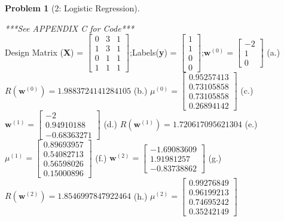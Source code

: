 \documentclass[11pt]{article}
\theoremstyle{quest}
\newtheorem*{question}{Problem}
\begin{document}
\newpage
\begin{question}[2: Logistic Regression] \end{question}
\textit{***See APPENDIX C for Code***}\\[5ex]
Design Matrix (\textbf{X}) = $\left[\begin{matrix}0&3&1\\ 1&3&1\\ 0&1&1\\1&1&1\end{matrix}\right]$;\;\;Labels(\textbf{y}) = $\left[\begin{matrix}1\\1\\0\\0\end{matrix}\right]$;\;\;$\mathbf{w}^{(0)} = \left[\begin{matrix}-2\\1\\0\end{matrix}\right]$
\subitem(a.) $R(\mathbf{w}^{(0)}) = 1.9883724141284105$
\subitem(b.) $\mu^{(0)} = \left[ \begin{matrix} 0.95257413\\0.73105858\\0.73105858\\0.26894142 \end{matrix}\right]$
\subitem(c.) $\mathbf{w}^{(1)} = \left[\begin{matrix} -2\\0.94910188\\-0.68363271 \end{matrix}\right]$
\subitem(d.) $R(\mathbf{w}^{(1)}) = 1.720617095621304$
\subitem(e.) $\mu^{(1)} = \left[ \begin{matrix} 0.89693957 \\ 0.54082713\\0.56598026\\0.15000896 \end{matrix}\right]$
\subitem(f.) $\mathbf{w}^{(2)} = \left[\begin{matrix} -1.69083609\\1.91981257\\-0.83738862 \end{matrix}\right]$
\subitem(g.) $R(\mathbf{w}^{(2)}) = 1.8546997847922464$
\subitem(h.) $\mu^{(2)} = \left[ \begin{matrix} 0.99276849\\0.96199213\\0.74695242\\0.35242149 \end{matrix}\right]$
\end{document}
